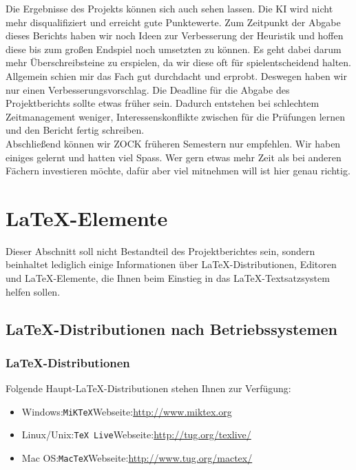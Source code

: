 \documentclass[12pt,a4paper,bibliography=totocnumbered,listof=totocnumbered]{scrartcl}
\begin{document}
	Die Ergebnisse des Projekts können sich auch sehen lassen. Die KI wird nicht mehr disqualifiziert und erreicht gute Punktewerte. Zum Zeitpunkt der Abgabe dieses Berichts haben wir noch Ideen zur Verbesserung der Heuristik und hoffen diese bis zum großen Endspiel noch umsetzten zu können. Es geht dabei darum mehr Überschreibsteine zu erspielen, da wir diese oft für spielentscheidend halten.\\
	Allgemein schien mir das Fach gut durchdacht und erprobt. Deswegen haben wir nur einen Verbesserungsvorschlag. Die Deadline für die Abgabe des Projektberichts sollte etwas früher sein. Dadurch entstehen bei schlechtem Zeitmanagement weniger, Interessenskonflikte zwischen für die Prüfungen lernen und den Bericht fertig schreiben.\\
	Abschließend können wir \glqq ZOCK \grqq{} früheren Semestern nur empfehlen. Wir haben einiges gelernt und hatten viel Spass. Wer gern etwas mehr Zeit als bei anderen Fächern investieren möchte, dafür aber viel mitnehmen will ist hier genau richtig.

    \newpage
    
    
    \section{\LaTeX-Elemente}
    Dieser Abschnitt soll nicht Bestandteil des Projektberichtes sein, sondern beinhaltet lediglich einige Informationen über \LaTeX-Distributionen, Editoren und \LaTeX-Elemente, die Ihnen beim Einstieg in das \LaTeX-Textsatzsystem helfen sollen.

    \subsection{\LaTeX-Distributionen nach Betriebssystemen}

    \subsubsection{\LaTeX-Distributionen}
    Folgende Haupt-\LaTeX-Distributionen stehen Ihnen zur Verfügung:
    \begin{itemize}
        \item Windows:\quad \texttt{MiKTeX}\quad Webseite:\quad\url{http://www.miktex.org}
        \item Linux/Unix:\quad \texttt{TeX Live}\quad Webseite:\quad\url{http://tug.org/texlive/}
        \item Mac OS:\quad \texttt{MacTeX}\quad Webseite:\quad\url{http://www.tug.org/mactex/}
    \end{itemize}
\end{document}
